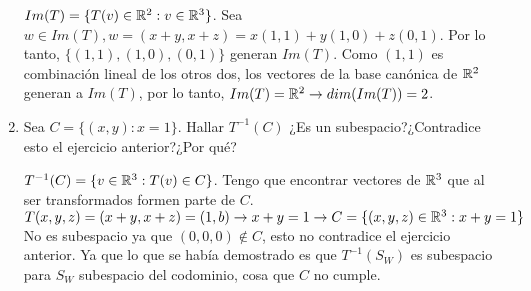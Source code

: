 \begin{enumerate}
            \begin{mdframed}[style=s]
                $Im(T)=\{T(v)\in\mathbb{R}^2:v\in\mathbb{R}^3\}$. Sea $w\in Im(T),w=(x+y,x+z)=x(1,1)+y(1,0)+z(0,1)$. Por lo tanto, $\{(1,1),(1,0),(0,1)\}$ generan $Im(T)$. Como $(1,1)$ es combinación lineal de los otros dos, los vectores de la base canónica de $\mathbb{R}^2$ generan a $Im(T)$, por lo tanto, $Im(T)=\mathbb{R}^2\to dim(Im(T))=2$.
            \end{mdframed}
        \item Sea $C=\{(x,y):x=1\}$. Hallar $T^{-1}(C)$ ¿Es un subespacio?¿Contradice esto el ejercicio anterior?¿Por qué?
            \begin{mdframed}[style=s]
                $T^{-1}(C)=\{v\in\mathbb{R}^3:T(v)\in C\}$. Tengo que encontrar vectores de $\mathbb{R}^3$ que al ser transformados formen parte de $C$.\\
                $T(x,y,z)=(x+y,x+z)=(1,b)\to x+y=1\to C=\{(x,y,z)\in\mathbb{R}^3:x+y=1\}$\\
                No es subespacio ya que $(0,0,0)\notin C$, esto no contradice el ejercicio anterior. Ya que lo que se había demostrado es que $T^{-1}(S_W)$ es subespacio para $S_W$ subespacio del codominio, cosa que $C$ no cumple.
            \end{mdframed}
    \end{enumerate}